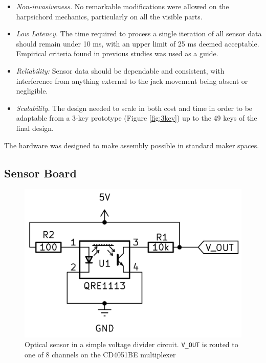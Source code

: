 \begin{itemize}
    \item \emph{Non-invasiveness.} No remarkable modifications were allowed on the harpsichord mechanics, particularly on all the visible parts.
    \item \emph{Low Latency.} The time required to process a single iteration of all sensor data should remain under 10 ms, with an upper limit of 25 ms deemed acceptable. Empirical criteria found in previous studies \cite{Jack2016} was used as a guide.
    \item \emph{Reliability:} Sensor data should be dependable and consistent, with interference from anything external to the jack movement being absent or negligible.
    \item \emph{Scalability.} The design needed to scale in both cost and time in order to be adaptable from a 3-key prototype (Figure \ref{fig:3key}) up to the 49 keys of the final design.
\end{itemize}

The hardware was designed to make assembly possible in standard maker spaces.  

\subsection{Sensor Board}\label{sensor-board}

\begin{figure}[!b] 
  \centering
  \includegraphics[width=0.7\linewidth]{src/images/simple-schematic-bw-.jpg} 
  \caption{Optical sensor in a simple voltage divider circuit. \texttt{V\_OUT} is routed to one of 8 channels on the CD4051BE multiplexer}
  \Description{} 
  \label{fig:simple-schematic}
\end{figure}

